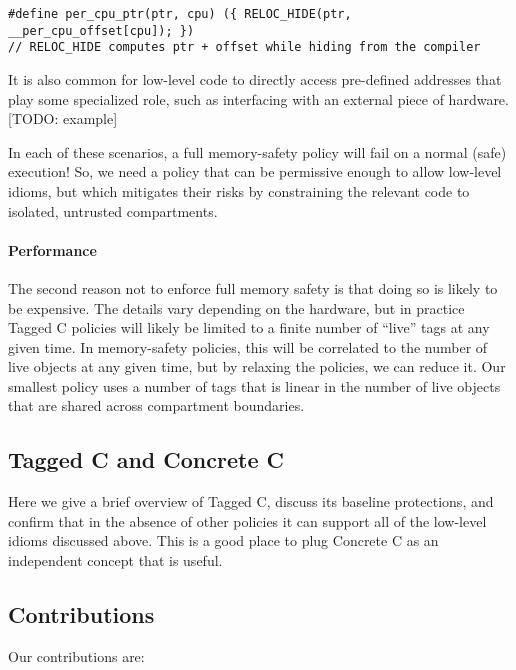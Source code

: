 \documentclass{article}
\begin{document}
\begin{verbatim}
#define per_cpu_ptr(ptr, cpu) ({ RELOC_HIDE(ptr, __per_cpu_offset[cpu]); })
// RELOC_HIDE computes ptr + offset while hiding from the compiler
\end{verbatim}

It is also common for low-level code to directly access pre-defined addresses that play
some specialized role, such as interfacing with an external piece of hardware.
[TODO: example]

In each of these scenarios, a full memory-safety policy will fail on a normal (safe)
execution! So, we need a policy that can be permissive enough to allow low-level idioms,
but which mitigates their risks by constraining the relevant code to isolated, untrusted compartments.

\paragraph{Performance}

The second reason not to enforce full memory safety is that doing so is likely to be expensive.
The details vary depending on the hardware, but in practice Tagged C policies will likely be
limited to a finite number of ``live'' tags at any given time. In memory-safety policies,
this will be correlated to the number of live objects at any given time, but by relaxing the
policies, we can reduce it. Our smallest policy uses a number of tags that is linear in
the number of live objects that are shared across compartment boundaries.

\subsection{Tagged C and Concrete C}

Here we give a brief overview of Tagged C, discuss its baseline protections, and confirm that
in the absence of other policies it can support all of the low-level idioms discussed above.
This is a good place to plug Concrete C as an independent concept that is useful.

\subsection{Contributions}

Our contributions are:
\end{document}
